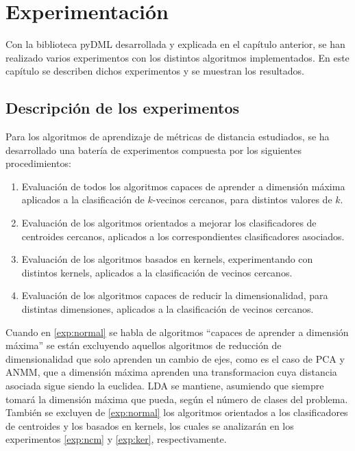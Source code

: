 \chapter{Experimentación} \label{chapter:experiments}

Con la biblioteca pyDML desarrollada y explicada en el capítulo anterior, se han realizado varios experimentos con los distintos algoritmos implementados. En este capítulo se describen dichos experimentos y se muestran los resultados.

\section{Descripción de los experimentos}

Para los algoritmos de aprendizaje de métricas de distancia estudiados, se ha desarrollado una batería de experimentos compuesta por los siguientes procedimientos:

\begin{enumerate}
    \item Evaluación de todos los algoritmos capaces de aprender a dimensión máxima aplicados a la clasificación de $k$-vecinos cercanos, para distintos valores de $k$. \label{exp:normal}
    \item Evaluación de los algoritmos orientados a mejorar los clasificadores de centroides cercanos, aplicados a los correspondientes clasificadores asociados. \label{exp:ncm}
    \item Evaluación de los algoritmos basados en kernels, experimentando con distintos kernels, aplicados a la clasificación de vecinos cercanos. \label{exp:ker}
    \item Evaluación de los algoritmos capaces de reducir la dimensionalidad, para distintas dimensiones, aplicados a la clasificación de vecinos cercanos. \label{exp:dim}
\end{enumerate}

Cuando en \ref{exp:normal} se habla de algoritmos ``capaces de aprender a dimensión máxima'' se están excluyendo aquellos algoritmos de reducción de dimensionalidad que solo aprenden un cambio de ejes, como es el caso de PCA y ANMM, que a dimensión máxima aprenden una transformacion cuya distancia asociada sigue siendo la euclidea. LDA se mantiene, asumiendo que siempre tomará la dimensión máxima que pueda, según el número de clases del problema. También se excluyen de \ref{exp:normal} los algoritmos orientados a los clasificadores de centroides y los basados en kernels, los cuales se analizarán en los experimentos \ref{exp:ncm} y \ref{exp:ker}, respectivamente.

